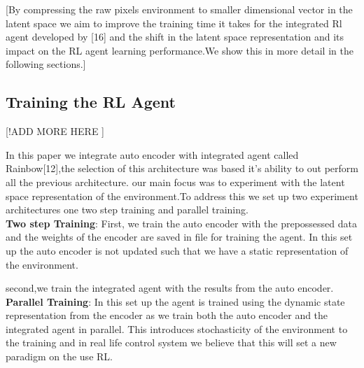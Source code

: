 [By compressing the raw pixels environment to smaller dimensional 
vector in the latent space we aim to improve the training 
time it takes for the integrated Rl agent developed by [16] 
and the shift in the latent space representation and its impact on 
the RL agent learning performance.We show this in more detail in the following sections.]


\subsection{Training the RL Agent} [!ADD MORE HERE ]

In this paper we integrate auto encoder with integrated agent 
called Rainbow[12],the selection of this architecture  was 
based it's ability to out perform all the previous architecture.
our main focus was to experiment with the latent space representation 
of the environment.To address this we set up two experiment architectures one two step training and parallel training.\\

\textbf{Two step Training}: First,
we train the auto encoder with the prepossessed data and the 
weights of the encoder are saved in file for training the agent.
In this set up the auto encoder is not updated such that we have a static representation of the environment.

second,we train the integrated agent with the results from the auto encoder.\\

\textbf{Parallel Training}:
In this set up the agent is trained using the dynamic 
state representation from the encoder as we train both the auto 
encoder and the integrated agent in parallel.
This introduces stochasticity of the environment to the training  and 
in real life control system we believe that this will set a new paradigm on the use RL.



